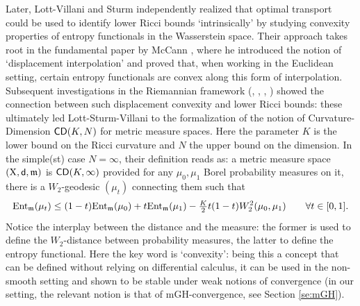 \documentclass[11pt]{article}
\numberwithin{equation}{section}
\newcommand{\X}{{\rm X}}
\newcommand{\sfd}{{\sf d}}
\newcommand{\mm}{{\mathfrak m}}
\newcommand{\CD}{{\sf CD}}
\newcommand{\ent}{{\rm Ent}_\mm}
\begin{document}
 Later, Lott-Villani \cite{Lott-Villani09} and Sturm \cite{Sturm06II,Sturm06I} independently realized that optimal transport could be used to identify lower Ricci bounds `intrinsically' by studying convexity properties of entropy functionals in the Wasserstein space. Their approach takes root in the fundamental paper by McCann \cite{McCann97}, where he introduced the notion of `displacement interpolation' and proved that, when working in the Euclidean setting, certain entropy functionals are convex along this form of interpolation. Subsequent investigations in the Riemannian framework (\cite{OV00}, \cite{CEMCS01}, \cite{vRS05}, \cite{CEMS06}) showed the connection between such displacement convexity and lower Ricci bounds: these  ultimately led Lott-Sturm-Villani to the formalization of the notion of Curvature-Dimension $\CD(K,N)$ for metric measure spaces. Here the parameter $K$ is the lower bound on the Ricci curvature and $N$ the upper bound on the dimension. In the simple(st) case  $N=\infty$, their definition reads as: a metric measure space $(\X,\sfd,\mm)$ is $\CD(K,\infty)$ provided for any $\mu_0,\mu_1$ Borel probability measures on it, there is a $W_2$-geodesic $(\mu_t)$ connecting them such that
 \begin{equation}
\label{eq:cdintro}
\ent(\mu_t)\leq (1-t)\ent(\mu_0)+t\ent(\mu_1)-\tfrac K2t(1-t)W_2^2(\mu_0,\mu_1)\qquad\forall t\in[0,1].
\end{equation}
Notice the interplay between the distance and the measure: the former is used to define the $W_2$-distance between probability measures, the latter to define the entropy functional.  Here the key word is `convexity': being this a concept that can be defined without relying on differential calculus, it can be  used in the non-smooth setting and shown to be stable under weak notions of convergence (in our setting, the relevant notion is that of mGH-convergence, see Section \ref{se:mGH}).



 
\end{document}
